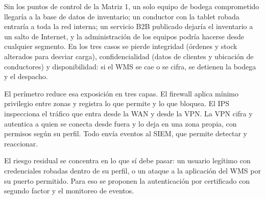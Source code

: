 \documentclass[11pt,a4paper]{article}
\begin{document}
Sin los puntos de control de la Matriz 1, un solo equipo de bodega comprometido llegaría a la base de datos de inventario; un conductor con la tablet robada entraría a toda la red interna; un servicio B2B publicado dejaría el inventario a un salto de Internet, y la administración de los equipos podría hacerse desde cualquier segmento. En los tres casos se pierde integridad (órdenes y stock alterados para desviar carga), confidencialidad (datos de clientes y ubicación de conductores) y disponibilidad: si el WMS se cae o se cifra, se detienen la bodega y el despacho.

El perímetro reduce esa exposición en tres capas. El firewall aplica mínimo privilegio entre zonas y registra lo que permite y lo que bloquea. El IPS inspecciona el tráfico que entra desde la WAN y desde la VPN. La VPN cifra y autentica a quien se conecta desde fuera y lo deja en una zona propia, con permisos según su perfil. Todo envía eventos al SIEM, que permite detectar y reaccionar.

El riesgo residual se concentra en lo que sí debe pasar: un usuario legítimo con credenciales robadas dentro de su perfil, o un ataque a la aplicación del WMS por su puerto permitido. Para eso se proponen la autenticación por certificado con segundo factor y el monitoreo de eventos.
\end{document}
